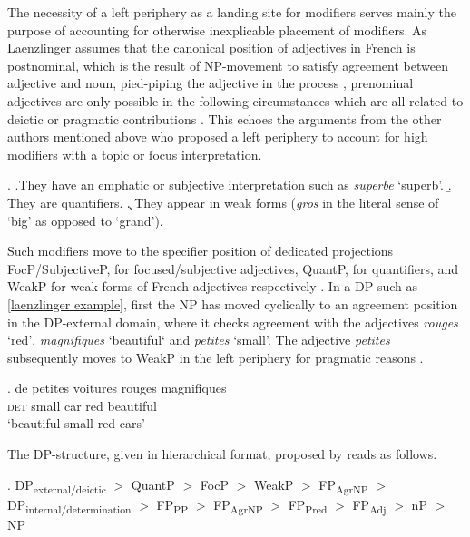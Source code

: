 \documentclass [output=book,colorlinks,citecolor=brown]{langscibook}
\begin{document}
The necessity of a left periphery as a landing site for modifiers serves mainly the purpose of accounting for otherwise inexplicable placement of modifiers. As Laenzlinger assumes that the canonical position of adjectives in French is postnominal, which is the result of NP-movement to satisfy agreement between adjective and noun, pied-piping the adjective in the process \citep[657–662]{laenzlinger:2005:french}, prenominal adjectives are only possible in the following circumstances which are all related to deictic or pragmatic contributions \citep[666]{laenzlinger:2005:french}. This echoes the arguments from the other authors mentioned above who proposed a left periphery to account for high modifiers with a topic or focus interpretation. %

\ex. \a.They have an emphatic or subjective interpretation such as \textit{superbe} `superb’.
\b. They are quantifiers.
\c. They appear in weak forms (\textit{gros} in the literal sense of `big’ as opposed to `grand’).

Such modifiers move to the specifier position of dedicated projections FocP/SubjectiveP, for focused/subjective adjectives, QuantP, for quantifiers, and WeakP for weak forms of French adjectives respectively \citep[666–668]{laenzlinger:2005:french}. In a DP such as \ref{laenzlinger example}, first the NP has moved cyclically to an agreement position in the DP-external domain, where it checks agreement with the adjectives \textit{rouges} `red’, \textit{magnifiques} `beautiful‘ and \textit{petites} `small’. The adjective \textit{petites} subsequently moves to WeakP in the left periphery for pragmatic reasons \citep[667]{laenzlinger:2005:french}. %

\exg. de petites voitures rouges magnifiques \\
\textsc{det} small car red beautiful\\
`beautiful small red cars’ \null \hfill \citep[668]{laenzlinger:2005:french} \label{laenzlinger example}

The DP-structure, given in hierarchical format, proposed by \citet{laenzlinger:2005:french, laenzlinger:2011:elements} reads as follows.

\ex. DP\textsubscript{external/deictic} $>$ QuantP $>$ FocP $>$ WeakP $>$ FP\textsubscript{AgrNP} $>$ DP\textsubscript{internal/determination} $>$ FP\textsubscript{PP} $>$ FP\textsubscript{AgrNP} $>$ FP\textsubscript{Pred} $>$ FP\textsubscript{Adj} $>$ nP $>$ NP \null \hfill \citep[35]{laenzlinger:2011:elements}
\end{document}
